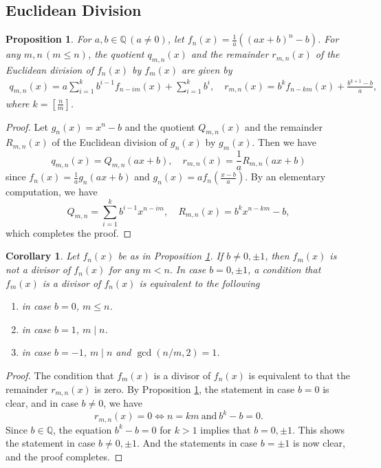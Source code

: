 \documentclass[a4paper, 11pt]{amsart}
\numberwithin{equation}{section}
\newtheorem{prop}[thm]{Proposition}
\newtheorem{cor}[thm]{Corollary}
\theoremstyle{definition}
\newcommand{\Q}{\mathbb{Q}}
\begin{document}


\subsection{Euclidean Division}


\begin{prop}\label{E-Div-mono}
For $a, b\in \Q\, (a\neq 0)$, let $f_n(x) = \frac{1}{a} ((ax + b)^n - b)$.
For any $m, n\, (m\leq n)$, the quotient $q_{m,n}(x)$ and the remainder $r_{m,n}(x)$ of the Euclidean division of $f_n(x)$ by $f_m(x)$ are given by
\begin{align*}
q_{m,n}(x)=a\sum_{i=1}^kb^{i-1}f_{n-im}(x)+\sum_{i=1}^kb^i, \quad 
r_{m,n}(x)=b^kf_{n-km}(x)+\frac{b^{k+1}-b}a,
\end{align*}
where $k=[\frac{n}{m}]$.
\end{prop}
\begin{proof}
Let $g_n(x)=x^n-b$ and the quotient $Q_{m,n}(x)$ and the remainder $R_{m,n}(x)$ of the Euclidean division of $g_n(x)$ by $g_m(x)$.
Then we have
\[
q_{m,n}(x)=Q_{m,n}(ax+b),\quad r_{m,n}(x)=\frac1a R_{m,n}(ax+b)
\]
since $f_n(x)=\frac1a g_n(ax+b)$ and $g_n(x)=af_n(\frac{x-b}a)$.
By an elementary computation, we have 
$$Q_{m,n}=\sum_{i=1}^kb^{i-1}x^{n-im},\quad R_{m,n}(x)=b^kx^{n-km}-b,$$
which completes the proof.
\end{proof}

\begin{cor}\label{Div-mono}
Let $f_n(x)$ be as in Proposition \ref{E-Div-mono}.
If $b\neq 0,\pm1$, then $f_m(x)$ is not a divisor of $f_n(x)$ for any $m<n.$
In case $b=0, \pm 1$, a condition that $f_m(x)$ is a divisor of $f_n(x)$ is equivalent to
the following
\begin{enumerate}[{\rm (1)}]
\item
in case $b=0$, $m\leq n$.
\item
in case $b=1$, $m\mid n$.
\item
in case $b=-1$, $m\mid n$ and $\gcd(n/m, 2)=1$.
\end{enumerate}
\end{cor}

\begin{proof}
The condition that $f_m(x)$ is a divisor of $f_n(x)$ is equivalent to that the remainder $r_{m,n}(x)$ is zero.
By Proposition \ref{E-Div-mono}, the statement in case $b=0$ is clear, and
in case $b\neq 0$, we have
\[
r_{m,n}(x)=0 \iff n=km \ \text{and}\ b^k-b=0.
\]
Since $b\in \Q$, the equation $b^k-b=0$ for $k>1$ implies that $b=0, \pm1$.
This shows the statement in case $b\neq 0, \pm 1.$
And the statements in case $b=\pm 1$ is now clear, and the proof completes. 
\end{proof}
\end{document}
